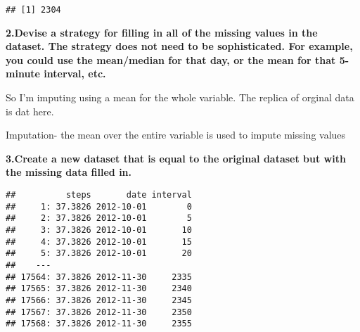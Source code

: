 \documentclass[]{article}
\newenvironment{Shaded}{\begin{snugshade}}{\end{snugshade}}
\newcommand{\CommentTok}[1]{\textcolor[rgb]{0.56,0.35,0.01}{\textit{#1}}}
\newcommand{\DataTypeTok}[1]{\textcolor[rgb]{0.13,0.29,0.53}{#1}}
\newcommand{\KeywordTok}[1]{\textcolor[rgb]{0.13,0.29,0.53}{\textbf{#1}}}
\newcommand{\NormalTok}[1]{#1}
\newcommand{\OperatorTok}[1]{\textcolor[rgb]{0.81,0.36,0.00}{\textbf{#1}}}
\newcommand{\OtherTok}[1]{\textcolor[rgb]{0.56,0.35,0.01}{#1}}
\newcommand{\StringTok}[1]{\textcolor[rgb]{0.31,0.60,0.02}{#1}}
\begin{document}
\begin{verbatim}
## [1] 2304
\end{verbatim}

\textbf{2.Devise a strategy for filling in all of the missing values in
the dataset. The strategy does not need to be sophisticated. For
example, you could use the mean/median for that day, or the mean for
that 5-minute interval, etc.}

So I'm imputing using a mean for the whole variable. The replica of
orginal data is dat here.

Imputation- the mean over the entire variable is used to impute missing
values

\begin{Shaded}
\end{Shaded}

\textbf{3.Create a new dataset that is equal to the original dataset but
with the missing data filled in.}

\begin{Shaded}
\end{Shaded}

\begin{verbatim}
##          steps       date interval
##     1: 37.3826 2012-10-01        0
##     2: 37.3826 2012-10-01        5
##     3: 37.3826 2012-10-01       10
##     4: 37.3826 2012-10-01       15
##     5: 37.3826 2012-10-01       20
##    ---                            
## 17564: 37.3826 2012-11-30     2335
## 17565: 37.3826 2012-11-30     2340
## 17566: 37.3826 2012-11-30     2345
## 17567: 37.3826 2012-11-30     2350
## 17568: 37.3826 2012-11-30     2355
\end{verbatim}
\end{document}

